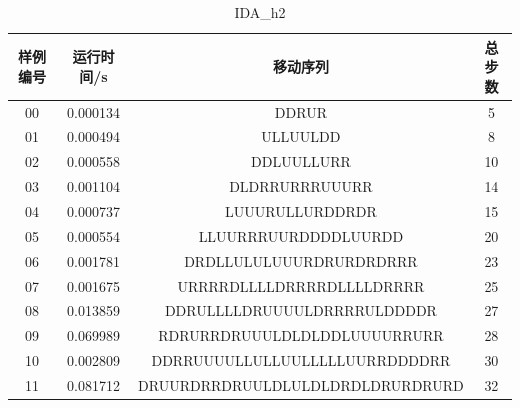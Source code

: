\documentclass[UTF8]{article}
\begin{document}
    \begin{table}[H]
        \centering
        \caption{IDA\_h2}
        \begin{tabular}{cccc}
            \hline
            样例编号 & 运行时间/s & 移动序列 & 总步数 \\
            \hline
            00 & 0.000134 & DDRUR & 5  \\
            01 & 0.000494 & ULLUULDD & 8  \\
            02 & 0.000558 & DDLUULLURR & 10  \\
            03 & 0.001104 & DLDRRURRRUUURR & 14  \\
            04 & 0.000737 & LUUURULLURDDRDR & 15  \\
            05 & 0.000554 & LLUURRRUURDDDDLUURDD & 20  \\
            06 & 0.001781 & DRDLLULULUUURDRURDRDRRR & 23  \\
            07 & 0.001675 & URRRRDLLLLDRRRRDLLLLDRRRR & 25  \\
            08 & 0.013859 & DDRULLLLDRUUUULDRRRRULDDDDR & 27  \\
            09 & 0.069989 & RDRURRDRUUULDLDLDDLUUUURRURR & 28  \\
            10 & 0.002809 & DDRRUUUULLULLUULLLLLUURRDDDDRR & 30  \\
            11 & 0.081712 & DRUURDRRDRUULDLULDLDRDLDRURDRURD & 32  \\
            \hline
        \end{tabular}
    \end{table}
\end{document}
